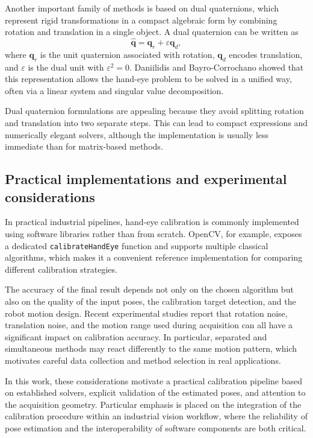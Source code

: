 Another important family of methods is based on dual quaternions, which represent rigid transformations in a compact algebraic form by combining rotation and translation in a single object. A dual quaternion can be written as
\begin{equation}
\hat{\mathbf{q}} = \mathbf{q}_r + \varepsilon \mathbf{q}_d,
\end{equation}
where \(\mathbf{q}_r\) is the unit quaternion associated with rotation, \(\mathbf{q}_d\) encodes translation, and \(\varepsilon\) is the dual unit with \(\varepsilon^2 = 0\). Daniilidis and Bayro-Corrochano showed that this representation allows the hand-eye problem to be solved in a unified way, often via a linear system and singular value decomposition. \cite{Daniilidis1996}

Dual quaternion formulations are appealing because they avoid splitting rotation and translation into two separate steps. This can lead to compact expressions and numerically elegant solvers, although the implementation is usually less immediate than for matrix-based methods. \cite{Daniilidis1996}

\subsection*{Practical implementations and experimental considerations}

In practical industrial pipelines, hand-eye calibration is commonly implemented using software libraries rather than from scratch. OpenCV, for example, exposes a dedicated \texttt{calibrateHandEye} function and supports multiple classical algorithms, which makes it a convenient reference implementation for comparing different calibration strategies. \cite{OpenCVHandEye}

The accuracy of the final result depends not only on the chosen algorithm but also on the quality of the input poses, the calibration target detection, and the robot motion design. Recent experimental studies report that rotation noise, translation noise, and the motion range used during acquisition can all have a significant impact on calibration accuracy. In particular, separated and simultaneous methods may react differently to the same motion pattern, which motivates careful data collection and method selection in real applications. \cite{Enebuse2022}

In this work, these considerations motivate a practical calibration pipeline based on established solvers, explicit validation of the estimated poses, and attention to the acquisition geometry. Particular emphasis is placed on the integration of the calibration procedure within an industrial vision workflow, where the reliability of pose estimation and the interoperability of software components are both critical. \cite{OpenCVHandEye,Enebuse2022}


